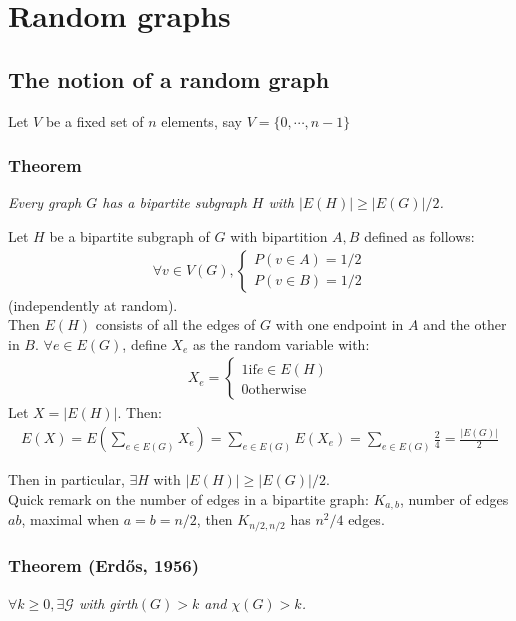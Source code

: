 
\chapter{Random graphs}

\section{The notion of a random graph}
Let $V$ be a fixed set of $n$ elements, say $V = \{0, \dotsb, n-1\}$
\subsection{Theorem}
\textit{Every graph $G$ has a bipartite subgraph $H$ with $|E(H)| \geq |E(G)|/2$.\\}

Let $H$ be a bipartite subgraph of $G$ with bipartition $A,B$ defined as follows:
\begin{eqnarray}
	\forall v \in V(G), \begin{cases}
		P(v \in A) = 1/2 \\
		P(v \in B) = 1/2 
	\end{cases}
\end{eqnarray}
(independently at random).\\

Then $E(H)$ consists of all the edges of $G$ with one endpoint in $A$ and the other in $B$. $\forall e \in E(G)$, define $X_e$ as the random variable with:
\begin{eqnarray}
	X_e = \begin{cases}
		1 \text{if} e \in E(H)\\
		0 \text{otherwise}
	\end{cases}
\end{eqnarray}
Let $X = |E(H)|$. Then:
\begin{eqnarray}
	E(X) = E(\sum_{e \in E(G)} X_e) = \sum_{e \in E(G)} E(X_e) = \sum_{e \in E(G)} \frac{2}{4} = \frac{|E(G)|}{2}
\end{eqnarray}

Then in particular, $\exists H$ with $|E(H)| \geq |E(G)|/2$.\\

Quick remark on the number of edges in a bipartite graph: $K_{a,b}$, number of edges $ab$, maximal when $a = b = n/2$, then $K_{n/2, n/2}$ has $n^2/4$ edges.

\subsection{Theorem (Erdős, 1956)}
\textit{$\forall k \geq 0, \exists \mathcal{G}$ with girth$(G) > k$ and $\chi(G) > k$.\\}

